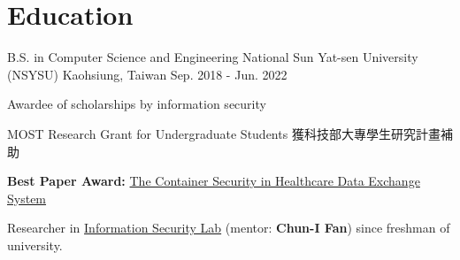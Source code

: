 \section*{Education}
\cventry
{B.S. in Computer Science and Engineering} %
{National Sun Yat-sen University (NSYSU)} %
{Kaohsiung, Taiwan} %
{Sep. 2018 - Jun. 2022} %
{
  \begin{cvitem} %
    \item {Awardee of scholarships by information security}
    \item {MOST Research Grant for Undergraduate Students 獲科技部大專學生研究計畫補助}
    \item {\textbf{Best Paper Award:} \href{https://github.com/25077667/Container_Security}{The Container Security in Healthcare Data Exchange System}}
    \item Researcher in \href{https://cifan.g-mail.nsysu.edu.tw/}{Information Security Lab} (mentor: \textbf{Chun-I Fan}) since freshman of university.
  \end{cvitem}
}

